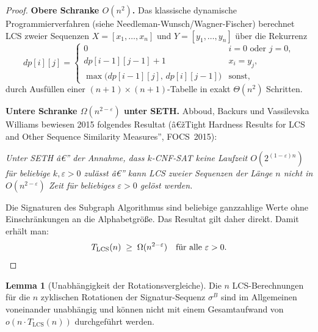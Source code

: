 ﻿\documentclass[a4paper,12pt]{article}
\theoremstyle{definition}
\newtheorem{lemma}{Lemma}
\begin{document}
\begin{proof}
\textbf{Obere Schranke $O(n^2)$.}
Das klassische dynamische Programmierverfahren (siehe Needleman-Wunsch/Wagner-Fischer) berechnet LCS zweier Sequenzen $X = [x_1, \ldots, x_n]$ und $Y = [y_1, \ldots, y_n]$ über die Rekurrenz
\[
	dp[i][j] = \begin{cases}
		0 & i = 0 \text{ oder } j = 0, \\
		dp[i-1][j-1] + 1 & x_i = y_j, \\
		\max\!\bigl(dp[i-1][j],\, dp[i][j-1]\bigr) & \text{sonst,}
	\end{cases}
\]
durch Ausfüllen einer $(n+1)\times(n+1)$-Tabelle in exakt $\Theta(n^2)$ Schritten.

\textbf{Untere Schranke $\Omega(n^{2-\varepsilon})$ unter SETH.}
Abboud, Backurs und Vassilevska Williams bewiesen 2015 folgendes Resultat
(â€žTight Hardness Results for LCS and Other Sequence Similarity Measures'', FOCS~2015):

\medskip
\emph{Unter SETH â€” der Annahme, dass $k$-CNF-SAT keine Laufzeit $O(2^{(1-\varepsilon)n})$ für beliebige $k, \varepsilon > 0$ zulässt â€” kann LCS zweier Sequenzen der Länge $n$ nicht in $O(n^{2-\varepsilon})$ Zeit für beliebiges $\varepsilon > 0$ gelöst werden.}
\medskip

Die Signaturen des Subgraph Algorithmus sind beliebige ganzzahlige Werte ohne Einschränkungen an die Alphabetgröße.
Das Resultat gilt daher direkt. Damit erhält man:
\[
	T_{\mathrm{LCS}}(n) \;\geq\; \Omega(n^{2-\varepsilon}) \quad \text{für alle } \varepsilon > 0. \qedhere
\]
\end{proof}

\begin{lemma}[Unabhängigkeit der Rotationsvergleiche]
\label{lem:unabhaengigkeit}
Die $n$ LCS-Berechnungen für die $n$ zyklischen Rotationen der Signatur-Sequenz $\sigma^B$
sind im Allgemeinen voneinander unabhängig und können nicht mit einem Gesamtaufwand von $o(n \cdot T_{\mathrm{LCS}}(n))$ durchgeführt werden.
\end{lemma}
\end{document}
